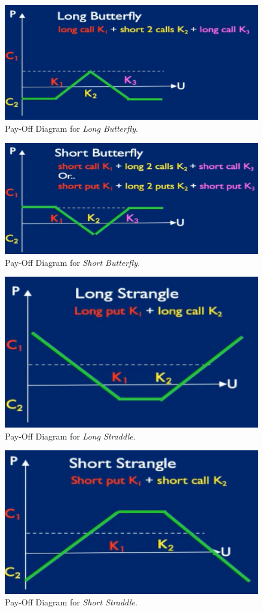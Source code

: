 \documentclass[11pt,a4paper]{article}
\begin{document}
  \begin{figure}[ht!]
    \centering
    \includegraphics[width=.5\textwidth]{longButterfly.PNG}
    \caption{Pay-Off Diagram for \textit{Long Butterfly}.}
    \label{fig_LongButterfly}
  \end{figure}

  \begin{figure}[ht!]
    \centering
    \includegraphics[width=.5\textwidth]{shortButterfly.PNG}
    \caption{Pay-Off Diagram for \textit{Short Butterfly}.}
    \label{fig_ShortButterfly}
  \end{figure}

  \begin{figure}[ht!]
    \centering
    \includegraphics[width=.5\textwidth]{longStrangle.PNG}
    \caption{Pay-Off Diagram for \textit{Long Straddle}.}
    \label{fig_LongStraddle}
  \end{figure}

  \begin{figure}[ht!]
    \centering
    \includegraphics[width=.5\textwidth]{shortStrangle.PNG}
    \caption{Pay-Off Diagram for \textit{Short Straddle}.}
    \label{fig_ShortStraddle}
  \end{figure}
\end{document}
